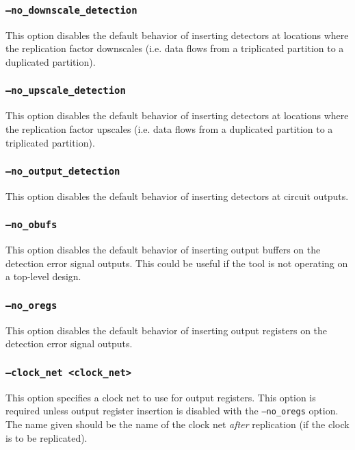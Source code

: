 \subsubsection{\texttt{--no\_downscale\_detection}}
This option disables the default behavior of inserting detectors at locations
where the replication factor downscales (i.e. data flows from a triplicated
partition to a duplicated partition).

\subsubsection{\texttt{--no\_upscale\_detection}}
This option disables the default behavior of inserting detectors at locations
where the replication factor upscales (i.e. data flows from a duplicated
partition to a triplicated partition).

\subsubsection{\texttt{--no\_output\_detection}}
This option disables the default behavior of inserting detectors at circuit
outputs.

\subsubsection{\texttt{--no\_obufs}}
This option disables the default behavior of inserting output buffers on the
detection error signal outputs. This could be useful if the tool is not
operating on a top-level design.

\subsubsection{\texttt{--no\_oregs}}
This option disables the default behavior of inserting output registers on the
detection error signal outputs.

\subsubsection{\texttt{--clock\_net <clock\_net>}}
This option specifies a clock net to use for output registers. This option is
required unless output register insertion is disabled with the
\texttt{--no\_oregs} option. The name given should be the name of the clock net
\emph{after} replication (if the clock is to be replicated).




